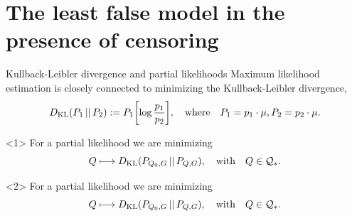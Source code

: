 \documentclass[smaller]{beamer}\usepackage{listings}
\begin{document}
\section{The least false model in the presence of censoring}
\label{sec:orga13c063}
\begin{frame}[label={sec:org553cac0}]{Kullback-Leibler divergence and partial likelihoods}
\small Maximum likelihood estimation is closely connected to minimizing the Kullback-Leibler
divergence,
\begin{equation*}
  D_{\mathrm{KL}}(P_1 \, || \, P_2) := P_1
  {\left[
    \log \frac{p_1}{p_2}
  \right]},
  \quad \text{where} \quad
  P_1 = p_1 \cdot \mu,   P_2 = p_2 \cdot \mu.
\end{equation*}

\begin{onlyenv}<1>
\color{white}For a partial likelihood we are minimizing
\begin{equation*}
  Q \longmapsto D_{\mathrm{KL}}(P_{Q_0,G} \, || \, P_{Q,G}),
  \quad \text{with} \quad Q \in \mathcal{Q}_*.
\end{equation*}
\color{black}

\vfill

\end{onlyenv}

\begin{onlyenv}<2>
For a partial likelihood we are minimizing
\begin{equation*}
  Q \longmapsto D_{\mathrm{KL}}(P_{Q_0,G} \, || \, P_{Q,G}),
  \quad \text{with} \quad Q \in \mathcal{Q}_*.
\end{equation*}
\color{black}

\vfill

\end{onlyenv}


\end{frame}
\end{document}
